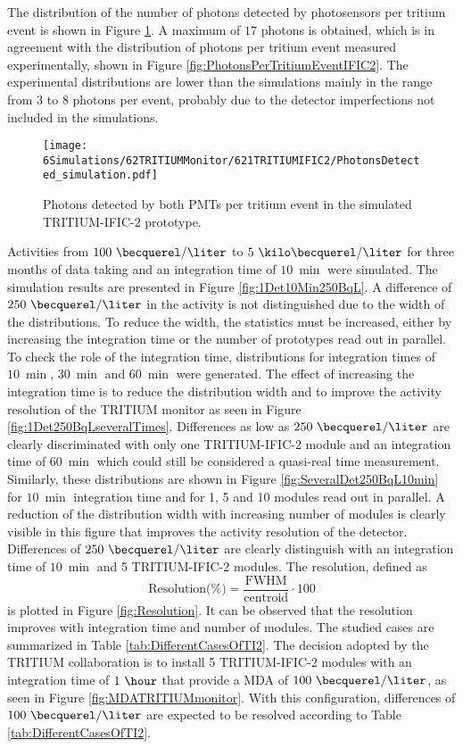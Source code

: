 The distribution of the number of photons detected by photosensors per tritium event is shown in Figure \ref{fig:SimulatedPhotonsDetected}. A maximum of $17$ photons is obtained, which is in agreement with the distribution of photons per tritium event measured experimentally, shown in Figure \ref{fig:PhotonsPerTritiumEventIFIC2}. The experimental distributions are lower than the simulations mainly in the range from $3$ to $8$ photons per event, probably due to the detector imperfections not included in the simulations.

\begin{figure}[hbtp]
\centering
\texttt{[image: 6Simulations/62TRITIUMMonitor/621TRITIUMIFIC2/PhotonsDetected\_simulation.pdf]}
\caption{Photons detected by both PMTs per tritium event in the simulated TRITIUM-IFIC-2 prototype.\label{fig:SimulatedPhotonsDetected}}
\end{figure}

Activities from $100~\becquerel/\liter$ to $5~\kilo\becquerel/\liter$ for three months of data taking and an integration time of $10~\min$ were simulated. The simulation results are presented in Figure \ref{fig:1Det10Min250BqL}. A difference of $250~\becquerel/\liter$ in the activity is not distinguished due to the width of the distributions. To reduce the width, the statistics must be increased, either by increasing the integration time or the number of prototypes read out in parallel. To check the role of the integration time, distributions for integration times of $10~\min$, $30~\min$ and $60~\min$ were generated. The effect of increasing the integration time is to reduce the distribution width and to improve the activity resolution of the TRITIUM monitor as seen in Figure \ref{fig:1Det250BqLseveralTimes}. Differences as low as $250~\becquerel/\liter$ are clearly discriminated with only one TRITIUM-IFIC-2 module and an integration time of $60~\min$ which could still be considered a quasi-real time measurement. Similarly, these distributions are shown in Figure \ref{fig:SeveralDet250BqL10min} for $10~\min$ integration time and for 1, 5 and 10 modules read out in parallel. A reduction of the distribution width with increasing number of modules is clearly visible in this figure that improves the activity resolution of the detector. Differences of $250~\becquerel/\liter$ are clearly distinguish with an integration time of $10~\min$ and 5 TRITIUM-IFIC-2 modules. The resolution, defined as
\begin{equation}
\text{Resolution(\%)}=\frac{\text{FWHM}}{\text{centroid}}\cdot{}100
\label{eq:Resolution}
\end{equation}
is plotted in Figure \ref{fig:Resolution}. It can be observed that the resolution improves with integration time and number of modules. The studied cases are summarized in Table \ref{tab:DifferentCasesOfTI2}. The decision adopted by the TRITIUM collaboration is to install 5 TRITIUM-IFIC-2 modules with an integration time of $1~\hour$ that provide a MDA of $100~\becquerel/\liter$, as seen in Figure \ref{fig:MDATRITIUMmonitor}. With this configuration, differences of $100~\becquerel/\liter$ are expected to be resolved according to Table \ref{tab:DifferentCasesOfTI2}. 

